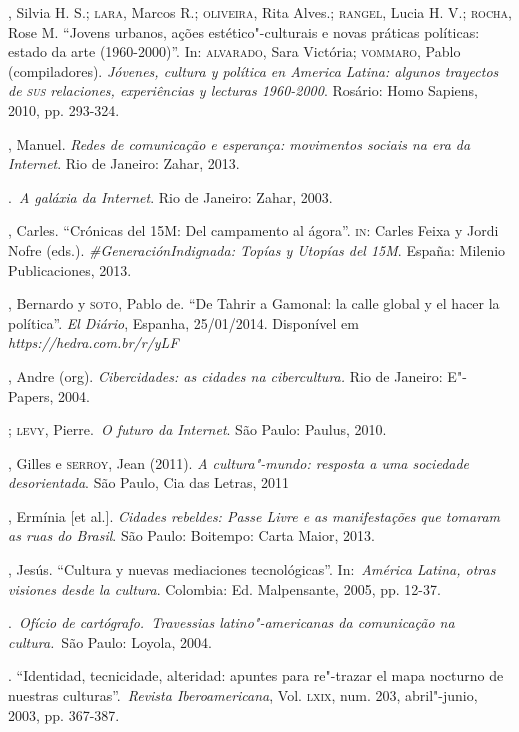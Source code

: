 \begin{bibliohedra}
, Silvia H. S.; \textsc{lara}, Marcos R.; \textsc{oliveira}, Rita Alves.; \textsc{rangel},
Lucia H. V.; \textsc{rocha}, Rose M. ``Jovens urbanos, ações estético"-culturais e
novas práticas políticas: estado da arte (1960-2000)''. In: \textsc{alvarado},
Sara Victória; \textsc{vommaro}, Pablo (compiladores). \emph{Jóvenes, cultura y
política en America Latina: algunos trayectos de \textsc{sus} relaciones,
experiências y lecturas 1960-2000}. Rosário: Homo Sapiens, 2010, pp.
293-324.

, Manuel. \emph{Redes de comunicação e esperança: movimentos
sociais na era da Internet}. Rio de Janeiro: Zahar, 2013.

\titidem.~\emph{A galáxia da Internet}. Rio de
Janeiro: Zahar, 2003.

, Carles. ``Crónicas del 15M: Del campamento al ágora''. \textsc{in}: Carles
Feixa y Jordi Nofre (eds.). \emph{\#GeneraciónIndignada: Topías y
Utopías del 15M}. España: Milenio Publicaciones, 2013.

, Bernardo y \textsc{soto}, Pablo de. ``De Tahrir a Gamonal: la calle
global y el hacer la política''. \emph{El Diário}, Espanha, 25/01/2014.
Disponível em
\emph{https://hedra.com.br/r/yLF}

, Andre (org). \emph{Cibercidades: as cidades na cibercultura.} Rio
de Janeiro: E"-Papers, 2004.

\titidem; \textsc{levy}, Pierre.~\emph{O futuro da Internet}. São Paulo:
Paulus, 2010.

, Gilles e \textsc{serroy}, Jean (2011). \emph{A cultura"-mundo:
resposta a uma sociedade desorientada}. São Paulo, Cia das Letras, 2011

, Ermínia {[}et al.{]}. \emph{Cidades rebeldes: Passe Livre e as
manifestações que tomaram as ruas do Brasil}. São Paulo: Boitempo: Carta
Maior, 2013.

, Jesús. ``Cultura y nuevas mediaciones tecnológicas''.
In:~\emph{América Latina, otras visiones desde la cultura}. Colombia:
Ed. Malpensante, 2005, pp. 12-37.

\titidem.~\emph{Ofício de
cartógrafo.~Travessias latino"-americanas da comunicação na cultura.}~São
Paulo: Loyola, 2004.

\titidem. ``Identidad, tecnicidade,
alteridad: apuntes para re"-trazar el mapa nocturno de nuestras
culturas''.~\emph{Revista Iberoamericana}, Vol. \textsc{lxix}, num. 203,
abril"-junio, 2003, pp. 367-387.


\end{bibliohedra}
